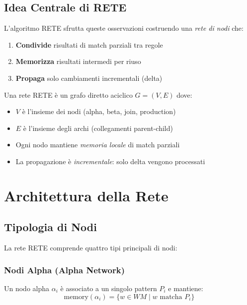 \subsection{Idea Centrale di RETE}

L'algoritmo RETE sfrutta queste osservazioni costruendo una \textit{rete di nodi} che:

\begin{enumerate}
\item \textbf{Condivide} risultati di match parziali tra regole
\item \textbf{Memorizza} risultati intermedi per riuso
\item \textbf{Propaga} solo cambiamenti incrementali (delta)
\end{enumerate}

\begin{definizione}
Una rete RETE è un grafo diretto aciclico $G = (V, E)$ dove:
\begin{itemize}
\item $V$ è l'insieme dei nodi (alpha, beta, join, production)
\item $E$ è l'insieme degli archi (collegamenti parent-child)
\item Ogni nodo mantiene \textit{memoria locale} di match parziali
\item La propagazione è \textit{incrementale}: solo delta vengono processati
\end{itemize}
\end{definizione}

\section{Architettura della Rete}

\subsection{Tipologia di Nodi}

La rete RETE comprende quattro tipi principali di nodi:

\subsubsection{Nodi Alpha (Alpha Network)}

\begin{definizione}
Un nodo alpha $\alpha_i$ è associato a un singolo pattern $P_i$ e mantiene:
\begin{equation}
\text{memory}(\alpha_i) = \{w \in WM \mid w \text{ matcha } P_i\}
\end{equation}
\end{definizione}

